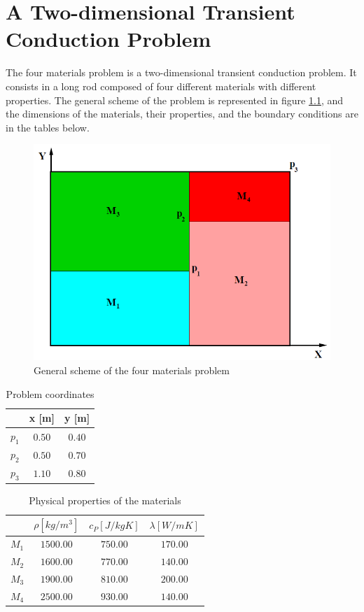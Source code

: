 \chapter{A Two-dimensional Transient Conduction Problem}
The four materials problem is a two-dimensional transient conduction problem. It consists in a long rod composed of four different materials with different properties. The general scheme of the problem is represented in figure \ref{fourmaterials}, and the dimensions of the materials, their properties, and the boundary conditions are in the tables below.
\begin{figure}[h]
	\centering
	\includegraphics[scale = 0.6]{FourMaterials/Fourmaterials}
	\caption{General scheme of the four materials problem}
	\label{fourmaterials}
\end{figure}
\begin{table}[h!]
	\centering
	\begin{tabular}{ |c|c|c|}
		\hline
		  & x [m] & y [m] \\ \hline
		 $p_{1}$ & $0.50$ & $0.40$ \\ \hline
		 $p_{2}$ & $0.50$ & $0.70$ \\ \hline
		 $p_{3}$ & $1.10$ & $0.80$ \\ \hline
	\end{tabular}
\caption{Problem coordinates}
\end{table}
\begin{table}[h!]
	\centering
	\begin{tabular}{ |c|c|c|c| }
		\hline
		& $\rho [kg/m^{3}]$ & $c_{P} [J/kgK]$ & $\lambda [W/mK]$ \\ \hline
		$M_{1}$ & $1500.00$ & $750.00$ & $170.00$ \\ \hline
		$M_{2}$ & $1600.00$ & $770.00$ & $140.00$ \\ \hline
		$M_{3}$ & $1900.00$ & $810.00$ & $200.00$ \\ \hline
		$M_{4}$ & $2500.00$ & $930.00$ & $140.00$ \\ \hline
	\end{tabular}
\caption{Physical properties of the materials}
\end{table}
